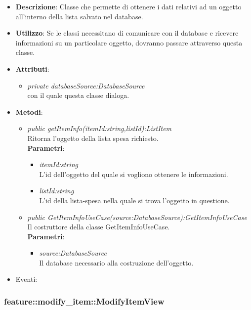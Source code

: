\begin{itemize}
\item \textbf{Descrizione}: Classe che permette di ottenere i dati relativi ad un oggetto all'interno della lista salvato nel database.
\item \textbf{Utilizzo}: Se le classi necessitano di comunicare con il database e ricevere informazioni su un particolare oggetto, dovranno passare attraverso questa classe.
\item \textbf{Attributi}: 
	\begin{itemize}
	\item \textit{private databaseSource:DatabaseSource}\\
  con il quale questa classe dialoga.
	\end{itemize}
\item \textbf{Metodi}:
	\begin{itemize}
	\item \textit{public getItemInfo(itemId:string,listId):ListItem}\\
	Ritorna l'oggetto della lista spesa richiesto.
			\\ \textbf{Parametri}: \begin{itemize}
			\item \textit{itemId:string}\\
			L'id dell'oggetto del quale si vogliono ottenere le informazioni.
			\item \textit{listId:string}\\
			L'id della lista-spesa nella quale si trova l'oggetto in questione.
			\end{itemize} 
			\item \textit{public GetItemInfoUseCase(source:DatabaseSource):GetItemInfoUseCase}\\
			Il costruttore della classe GetItemInfoUseCase.
				\\ \textbf{Parametri}: \begin{itemize}
				\item \textit{source:DatabaseSource}\\
				Il database necessario alla costruzione dell'oggetto.
			\end{itemize} 
	\end{itemize}
\item{Eventi}:
\end{itemize}

\subsubsection{feature::modify\_item::ModifyItemView}

